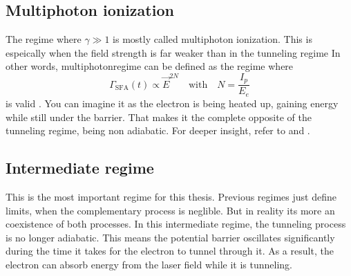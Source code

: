 \subsection{Multiphoton ionization}
The regime where $\gamma \gg 1$ is mostly called multiphoton ionization. 
This is espeically when the field strength is far weaker than in the tunneling regime
In other words, multiphotonregime can be defined as the regime where
\begin{equation*}
    \Gamma_{\mathrm{SFA}}(t) \propto \vec{E}^{2N} \quad \text{with} \quad N = \frac{I_p}{E_e}
\end{equation*}
is valid \cite{Ivanov20012005}. 
You can imagine it as the electron is being heated up, gaining energy while still under the barrier.
That makes it the complete opposite of the tunneling regime, being non adiabatic.
For deeper insight, refer to \cite{Ivanov20012005} and \cite{Keldysh:1965ojf}.



\subsection{Intermediate regime}
This is the most important regime for this thesis. 
Previous regimes just define limits, when the complementary process is neglible.
But in reality its more an coexistence of both processes.
In this intermediate regime, the tunneling process is no longer adiabatic. 
This means the potential barrier oscillates significantly during the time it takes for the electron to tunnel through it. 
As a result, the electron can absorb energy from the laser field while it is tunneling. 